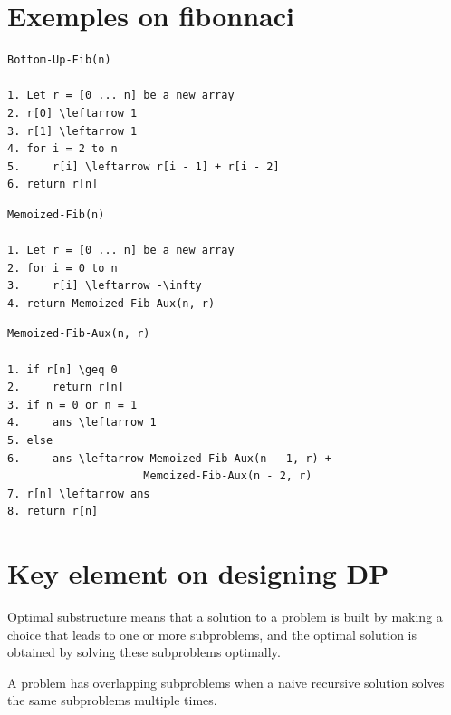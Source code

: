 \documentclass[11pt,a4paper,openany]{book}
\begin{document}
\vspace{2cm}

\section{Exemples on fibonnaci}


\begin{lstlisting}
Bottom-Up-Fib(n)

1. Let r = [0 ... n] be a new array
2. r[0] \leftarrow 1
3. r[1] \leftarrow 1
4. for i = 2 to n
5.     r[i] \leftarrow r[i - 1] + r[i - 2]
6. return r[n]
\end{lstlisting}

\begin{lstlisting}
Memoized-Fib(n)

1. Let r = [0 ... n] be a new array
2. for i = 0 to n
3.     r[i] \leftarrow -\infty
4. return Memoized-Fib-Aux(n, r)
\end{lstlisting}

\begin{lstlisting}
Memoized-Fib-Aux(n, r)

1. if r[n] \geq 0
2.     return r[n]
3. if n = 0 or n = 1
4.     ans \leftarrow 1
5. else
6.     ans \leftarrow Memoized-Fib-Aux(n - 1, r) +
                     Memoized-Fib-Aux(n - 2, r)
7. r[n] \leftarrow ans
8. return r[n]
\end{lstlisting}











\vspace{2cm}

\section{Key element on designing DP}


\begin{defnbox}[title=Optimal Substructure]
Optimal substructure means that a solution to a problem is built by making a choice that leads to one or more subproblems, and the optimal solution is obtained by solving these subproblems optimally.
\end{defnbox}

\begin{defnbox}[title=Overlapping Subproblems]
A problem has overlapping subproblems when a naive recursive solution solves the same subproblems multiple times.
\end{defnbox}
\end{document}
